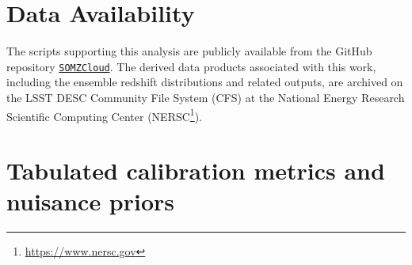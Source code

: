 \documentclass[fleqn, usenatbib]{mnras}
\begin{document}
\section*{Data Availability}

The scripts supporting this analysis are publicly available from the GitHub repository \href{https://github.com/CosmoCloudZhang/SOMZCloud.git}{\faGithub \texttt{SOMZCloud}}. The derived data products associated with this work, including the ensemble redshift distributions and related outputs, are archived on the LSST DESC Community File System (CFS) at the National Energy Research Scientific Computing Center (NERSC\footnote{\url{https://www.nersc.gov}}).







\appendix

\section{Tabulated calibration metrics and nuisance priors} \label{sec:A}


\bsp
\label{lastpage}
\end{document}
